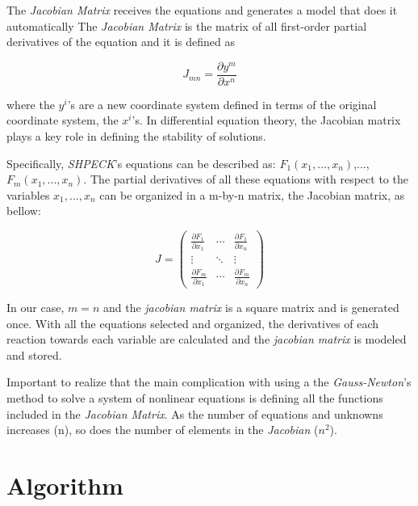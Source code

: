 The \emph{Jacobian Matrix} receives the equations and generates a model that does it automatically The \emph{Jacobian Matrix} is the matrix of all first-order partial derivatives of the equation and it is defined as

\begin{equation}
\label{eq:JacobianDefinition}
J_{mn} = \frac{\partial y^m}{\partial x^n}
\end{equation}

where the $y^i$'s are a new coordinate system defined in terms of the original coordinate system, the $x^i$'s. In differential equation theory, the Jacobian matrix plays a key role in defining the stability of solutions.

Specifically, \emph{SHPECK}'s equations can be described as: $F_1(x_1,..., x_n)$,...,$F_m(x_1,...,x_n)$. The partial derivatives of all these equations with respect to the variables $x_1,...,x_n$ can be organized in a m-by-n matrix, the Jacobian matrix, as bellow:

\begin{equation} 
J =
 \begin{pmatrix}
  \frac{\partial F_1}{\partial x_1} & \cdots & \frac{\partial F_1}{\partial x_n} \\
  \vdots  & \ddots & \vdots  \\
  \frac{\partial F_m}{\partial x_1} & \cdots &   \frac{\partial F_m}{\partial x_n}
 \end{pmatrix}
\end{equation}

In our case, $m = n$ and the \emph{jacobian matrix} is a square matrix and is generated once. With all the equations selected and organized, the derivatives of each reaction towards each variable are calculated and the \emph{jacobian matrix} is modeled and stored. 

Important to realize that the main complication with using a the \emph{Gauss-Newton}'s method to solve a system of nonlinear equations is defining all the functions included in the \emph{Jacobian Matrix}. As the number of equations and unknowns increases (n), so does the number of elements in the \emph{Jacobian} ($n^2$).

\section{Algorithm}

